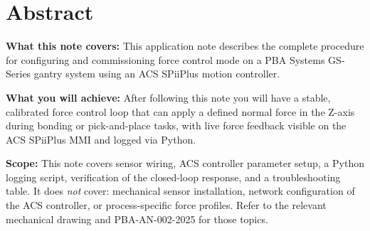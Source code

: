 
\section*{Abstract}
\label{sec:abstract}


\noindent
\begin{tcolorbox}[
  enhanced, breakable,
  colback=PBALightGray, colframe=PBABlue,
  leftrule=4pt, rightrule=0.5pt, toprule=0.5pt, bottomrule=0.5pt,
  arc=2pt, left=10pt, right=10pt, top=8pt, bottom=8pt,
]

\textbf{What this note covers:}\enspace
This application note describes the complete procedure for configuring and
commissioning force control mode on a PBA Systems GS-Series gantry system
using an ACS SPiiPlus motion controller.

\medskip
\textbf{What you will achieve:}\enspace
After following this note you will have a stable, calibrated force control
loop that can apply a defined normal force in the Z-axis during bonding or
pick-and-place tasks, with live force feedback visible on the ACS SPiiPlus
MMI and logged via Python.

\medskip
\textbf{Scope:}\enspace
This note covers sensor wiring, ACS controller parameter setup, a Python
logging script, verification of the closed-loop response, and a
troubleshooting table.
It does \textit{not} cover: mechanical sensor installation, network
configuration of the ACS controller, or process-specific force profiles.
Refer to the relevant mechanical drawing and \mbox{PBA-AN-002-2025} for
those topics.

\end{tcolorbox}

\clearpage
